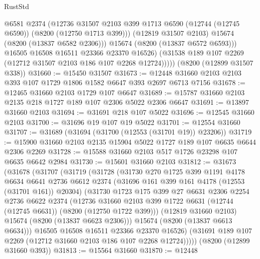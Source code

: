 \begin{lexlean}{RustStd}
\begin{coremodule}
                @6581
                @2374
                (@12736
                  @31507
                  @2103
                  @399
                  @1713
                  @6590
                  (@12744 (@12745 @6590))
                  (@8200 (@12750 @1713 @399)))
                (@12819 @31507 @2103)
                @15674
                (@8200 (@13837 @6582 @2306)))
              @15674
              (@8200 (@13837 @6572 @6593)))
            @16505
            @16508
            @16511
            @23366
            @23370
            @16526)
          (@31538 @189 @107 @2269 (@12712 @31507 @2103 @186 @107 @2268 @12724)))))
    (@8200 (@12899 @31507 @338))
@31660 := @15450 @31507
@31673 := @12448 @31660 @2103 @2103 @393 @107 @1729 @1806 @1582 @6647 @393 @2697 @6713 @7156
@31678 := @12465 @31660 @2103 @1729 @107 @6647
@31689 := @15787 @31660 @2103 @2135 @218 @1727 @189 @107 @2306 @5022 @2306 @6647
@31691 := @13897 @31660 @2103
@31694 := @31691 @218 @107 @5022
@31696 := @12545 @31660 @2103
@31700 := @31696 @19 @107 @19 @5022
@31701 := @12554 @31660
@31707 := @31689 (@31694 (@31700 (@12553 (@31701 @19)) @23206))
@31719 := @15900 @31660 @2103 @2135 @15904 @5022 @1727 @189 @107 @6635 @6644 @2306 @2269
@31728 := @15588 @31660 @2103 @517 @1726 @23298 @107 @6635 @6642 @2984
@31730 := @15601 @31660 @2103
@31812 := @31673
    (@31678
      (@31707
        (@31719
          (@31728
            (@31730
              @270
              @1725
              @399
              @1191
              @4178
              @6634
              @6641
              @2736
              @6612
              @2374
              (@31696 @161 @399 @161 @4178 (@12553 (@31701 @161)) @20304)
              (@31730
                @1723
                @175
                @399
                @27
                @6631
                @2306
                @2254
                @2736
                @6622
                @2374
                (@12736
                  @31660
                  @2103
                  @399
                  @1722
                  @6631
                  (@12744 (@12745 @6631))
                  (@8200 (@12750 @1722 @399)))
                (@12819 @31660 @2103)
                @15674
                (@8200 (@13837 @6623 @2306)))
              @15674
              (@8200 (@13837 @6613 @6634)))
            @16505
            @16508
            @16511
            @23366
            @23370
            @16526)
          (@31691 @189 @107 @2269 (@12712 @31660 @2103 @186 @107 @2268 @12724)))))
    (@8200 (@12899 @31660 @393))
@31813 := @15564 @31660
@31870 := @12448

\end{coremodule}
\end{lexlean}

